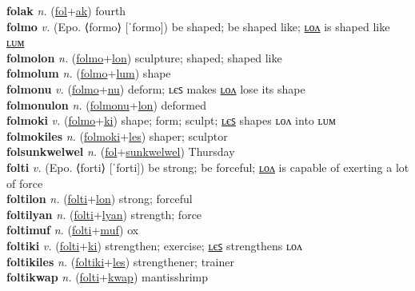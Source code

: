 \textbf{folak} \textit{n.} (\hyperref[fol]{fol}+\hyperref[ak]{ak})
fourth \label{folak} \\
\textbf{folmo} \textit{v.} (Epo. ⟨formo⟩ [ˈformo])
be shaped; be shaped like; \hyperref[folmolon]{ʟᴏᴧ} is shaped like \hyperref[folmolum]{ʟᴜᴍ} \label{folmo} \\
\textbf{folmolon} \textit{n.} (\hyperref[folmo]{folmo}+\hyperref[lon]{lon})
sculpture; shaped; shaped like \label{folmolon} \\
\textbf{folmolum} \textit{n.} (\hyperref[folmo]{folmo}+\hyperref[lum]{lum})
shape \label{folmolum} \\
\textbf{folmonu} \textit{v.} (\hyperref[folmo]{folmo}+\hyperref[nu]{nu})
deform; ʟєꜱ makes \hyperref[folmonulon]{ʟᴏᴧ} lose its shape \label{folmonu} \\
\textbf{folmonulon} \textit{n.} (\hyperref[folmonu]{folmonu}+\hyperref[lon]{lon})
deformed \label{folmonulon} \\
\textbf{folmoki} \textit{v.} (\hyperref[folmo]{folmo}+\hyperref[ki]{ki})
shape; form; sculpt; \hyperref[folmokiles]{ʟєꜱ} shapes ʟᴏᴧ into ʟᴜᴍ \label{folmoki} \\
\textbf{folmokiles} \textit{n.} (\hyperref[folmoki]{folmoki}+\hyperref[les]{les})
shaper; sculptor \label{folmokiles} \\
\textbf{folsunkwelwel} \textit{n.} (\hyperref[fol]{fol}+\hyperref[sunkwelwel]{sunkwelwel})
Thursday \label{folsunkwelwel} \\
\textbf{folti} \textit{v.} (Epo. ⟨forti⟩ [ˈforti])
be strong; be forceful; \hyperref[foltilon]{ʟᴏᴧ} is capable of exerting a lot of force \label{folti} \\
\textbf{foltilon} \textit{n.} (\hyperref[folti]{folti}+\hyperref[lon]{lon})
strong; forceful \label{foltilon} \\
\textbf{foltilyan} \textit{n.} (\hyperref[folti]{folti}+\hyperref[lyan]{lyan})
strength; force \label{foltilyan} \\
\textbf{foltimuf} \textit{n.} (\hyperref[folti]{folti}+\hyperref[muf]{muf})
ox \label{foltimuf} \\
\textbf{foltiki} \textit{v.} (\hyperref[folti]{folti}+\hyperref[ki]{ki})
strengthen; exercise; \hyperref[foltikiles]{ʟєꜱ} strengthens ʟᴏᴧ \label{foltiki} \\
\textbf{foltikiles} \textit{n.} (\hyperref[foltiki]{foltiki}+\hyperref[les]{les})
strengthener; trainer \label{foltikiles} \\
\textbf{foltikwap} \textit{n.} (\hyperref[folti]{folti}+\hyperref[kwap]{kwap})
mantisshrimp \label{foltikwap} \\

